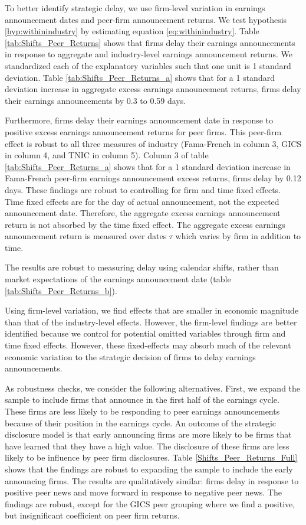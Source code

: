 \documentclass[ecta,nameyear,draft]{econsocart}
\theoremstyle{theorem}
\numberwithin{lemma}{section}
\numberwithin{proposition}{section}
\numberwithin{equation}{section}
\numberwithin{figure}{section}
\begin{document}
To better identify strategic delay, we use firm-level variation in earnings announcement dates and peer-firm announcement returns. We test hypothesis \ref{hyp:withinindustry} by estimating equation \ref{eq:withinindustry}. Table \ref{tab:Shifts_Peer_Returns} shows that firms delay their earnings announcements in response to aggregate and industry-level earnings announcement returns. We standardized each of the explanatory variables such that one unit is 1 standard deviation.  Table \ref{tab:Shifts_Peer_Returns_a} shows that for a 1 standard deviation increase in aggregate excess earnings announcement returns, firms delay their earnings announcements by 0.3 to 0.59 days. 

Furthermore, firms delay their earnings announcement date in response to positive excess earnings announcement returns for peer firms. This peer-firm effect is robust to all three measures of industry (Fama-French in column 3, GICS in column 4, and TNIC in column 5). Column 3 of table \ref{tab:Shifts_Peer_Returns_a} shows that for a 1 standard deviation increase in Fama-French peer-firm earnings announcement excess returns, firms delay by 0.12 days. These findings are robust to controlling for firm and time fixed effects. Time fixed effects are for the day of actual announcement, not the expected announcement date. Therefore, the aggregate excess earnings announcement return is not absorbed by the time fixed effect. The aggregate excess earnings announcement return is measured over dates $\tau$ which varies by firm in addition to time. 

The results are robust to measuring delay using calendar shifts, rather than market expectations of the earnings announcement date (table \ref{tab:Shifts_Peer_Returns_b}). 

Using firm-level variation, we find effects that are smaller in economic magnitude than that of the industry-level effects. However, the firm-level findings are better identified because we control for potential omitted variables through firm and time fixed effects. However, these fixed-effects may absorb much of the relevant economic variation to the strategic decision of firms to delay earnings announcements. 

As robustness checks, we consider the following alternatives. First, we expand the sample to include firms that announce in the first half of the earnings cycle. These firms are less likely to be responding to peer earnings announcements because of their position in the earnings cycle. An outcome of the strategic disclosure model is that early announcing firms are more likely to be firms that have learned that they have a high value. The disclosure of these firms are less likely to be influence by peer firm disclosures. Table \ref{Shifts_Peer_Returns_Full} shows that the findings are robust to expanding the sample to include the early announcing firms. The results are qualitatively similar: firms delay in response to positive peer news and move forward in response to negative peer news. The findings are robust, except for the GICS peer grouping where we find a positive, but insignificant coefficient on peer firm returns. 
\end{document}
